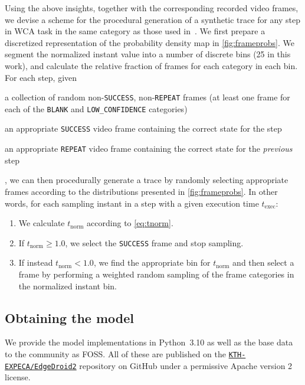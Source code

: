 Using the above insights, together with the corresponding recorded video frames, we devise a scheme for the procedural generation of a synthetic trace for any step in \ac{WCA} task in the same category as those used in~\cite{olguinmunoz2021impact}.
We first prepare a discretized representation of the probability density map in \cref{fig:frameprobs}.
We segment the normalized instant value into a number of discrete bins (\num{25} in this work), and calculate the relative fraction of frames for each category in each bin.
For each step, given
\begin{enumerate*}[itemjoin={{; }}, itemjoin*={{; and }}]
    \item a collection of random non-\texttt{SUCCESS}, non-\texttt{REPEAT} frames (at least one frame for each of the \texttt{BLANK} and \texttt{LOW\_CONFIDENCE} categories)
    \item an appropriate \texttt{SUCCESS} video frame containing the correct state for the step
    \item an appropriate \texttt{REPEAT} video frame containing the correct state for the \emph{previous} step
\end{enumerate*},
we can then procedurally generate a trace by randomly selecting appropriate frames according to the distributions presented in \cref{fig:frameprobs}.
In other words, for each sampling instant in a step with a given execution time \( t_\text{exec} \):
\begin{enumerate}
    \item We calculate \( t_\text{norm} \) according to \cref{eq:tnorm}.
    \item If \( t_\text{norm} \ge 1.0 \), we select the \texttt{SUCCESS} frame and stop sampling.
    \item If instead \( t_\text{norm} < 1.0 \), we find the appropriate bin for \( t_\text{norm} \) and then select a frame by performing a weighted random sampling of the frame categories in the normalized instant bin.
\end{enumerate}

\subsection{Obtaining the model}\label{ssec:model:obtaining}

We provide the model implementations in Python~\num{3.10} as well as the base data to the community as \ac{FOSS}.
All of these are published on the \href{https://github.com/KTH-EXPECA/EdgeDroid2}{\texttt{KTH-EXPECA/EdgeDroid2}} repository on GitHub under a permissive Apache version 2 license.